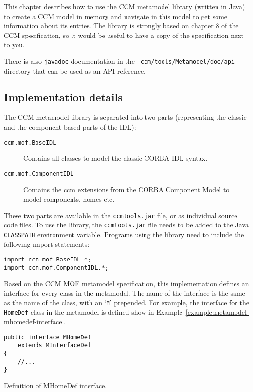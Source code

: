 This chapter describes how to use the CCM metamodel library (written in Java) to
create a CCM model in memory and navigate in this model to get some information
about its entries. The library is strongly based on chapter 8 of the CCM
specification, so it would be useful to have a copy of the specification next to
you.

There is also {\tt javadoc} documentation in the {\tt
ccm/tools/Metamodel/doc/api} directory that can be used as an API reference.

\subsection{Implementation details}

The CCM metamodel library is separated into two parts (representing the classic
and the component based parts of the IDL):

\begin{description}
\item [{\tt ccm.mof.BaseIDL}] Contains all classes to model the classic CORBA
      IDL syntax.
\item [{\tt ccm.mof.ComponentIDL}] Contains the ccm extensions from the CORBA
      Component Model to model components, homes etc.
\end{description}

These two parts are available in the {\tt ccmtools.jar} file, or as individual
source code files. To use the library, the {\tt ccmtools.jar} file needs to be
added to the Java {\tt CLASSPATH} environment variable. Programs using the
library need to include the following import statements:

\begin{verbatim}
import ccm.mof.BaseIDL.*;
import ccm.mof.ComponentIDL.*;
\end{verbatim}

Based on the CCM MOF metamodel specification, this implementation defines an
interface for every class in the metamodel. The name of the interface is the
same as the name of the class, with an `{\tt M}' prepended. For example, the
interface for the {\tt HomeDef} class in the metamodel is defined show in
Example~\ref{example:metamodel-mhomedef-interface}.

\begin{Example}
\begin{minifbox}
\begin{verbatim}
public interface MHomeDef
    extends MInterfaceDef
{
    //...
}
\end{verbatim}
\caption{Definition of MHomeDef interface.}
\label{example:metamodel-mhomedef}
\end{minifbox}
\end{Example}

